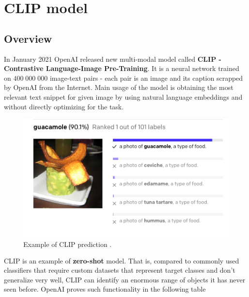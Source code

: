 \documentclass[12pt,a4paper,openany]{book}
\begin{document}

\section{CLIP model}
\subsection{Overview}
\noindent In January 2021 OpenAI released new multi-modal model called \textbf{CLIP - Contrastive Language-Image Pre-Training}.  It is a neural network trained on $400 \;000 \;000$ image-text pairs - each pair is an image and its caption scrapped by OpenAI from the Internet. Main usage of the model is obtaining the most relevant text snippet for given image by using natural language embeddings and without directly optimizing for the task.
 \begin{figure}[ht!]
     \centering
     \includegraphics[scale=0.6]{figs/clip_example.png}
     \caption{Example of CLIP prediction \cite{clip_blog}.}
 \end{figure}
\noindent CLIP is an example of \textbf{zero-shot} model.  That is, compared to commonly used classifiers that require custom datasets that represent target classes and don't generalize very well, CLIP can identify an enormous range of objects it has never seen before. OpenAI proves such functionality in the following table
\newline
\end{document}
